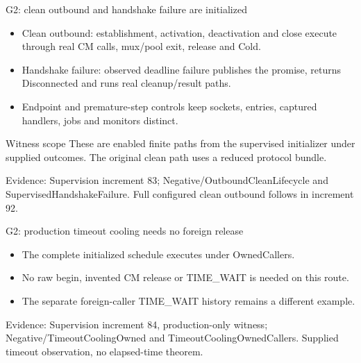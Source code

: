 \documentclass[11pt,aspectratio=169]{beamer}
\newcommand{\evidence}[1]{\vfill{\fontsize{7}{8}\selectfont\color{Muted}Evidence: #1\par}}
\begin{document}
\begin{frame}{G2: clean outbound and handshake failure are initialized}
\begin{itemize}\setlength\itemsep{2.5mm}
\item Clean outbound: establishment, activation, deactivation and close execute through real CM calls, mux/pool exit, release and Cold.
\item Handshake failure: observed deadline failure publishes the promise, returns Disconnected and runs real cleanup/result paths.
\item Endpoint and premature-step controls keep sockets, entries, captured handlers, jobs and monitors distinct.
\end{itemize}\begin{alertblock}{Witness scope}
These are enabled finite paths from the supervised initializer under supplied outcomes. The original clean path uses a reduced protocol bundle.
\end{alertblock}
\evidence{Supervision increment 83; Negative/OutboundCleanLifecycle and SupervisedHandshakeFailure. Full configured clean outbound follows in increment 92.}
\end{frame}

\begin{frame}{G2: production timeout cooling needs no foreign release}
\centering
{}
\par\vspace{4mm}
\begin{itemize}\setlength\itemsep{2.5mm}
\item The complete initialized schedule executes under OwnedCallers.
\item No raw begin, invented CM release or TIME\_WAIT is needed on this route.
\item The separate foreign-caller TIME\_WAIT history remains a different example.
\end{itemize}
\evidence{Supervision increment 84, production-only witness; Negative/TimeoutCoolingOwned and TimeoutCoolingOwnedCallers. Supplied timeout observation, no elapsed-time theorem.}
\end{frame}
\end{document}
